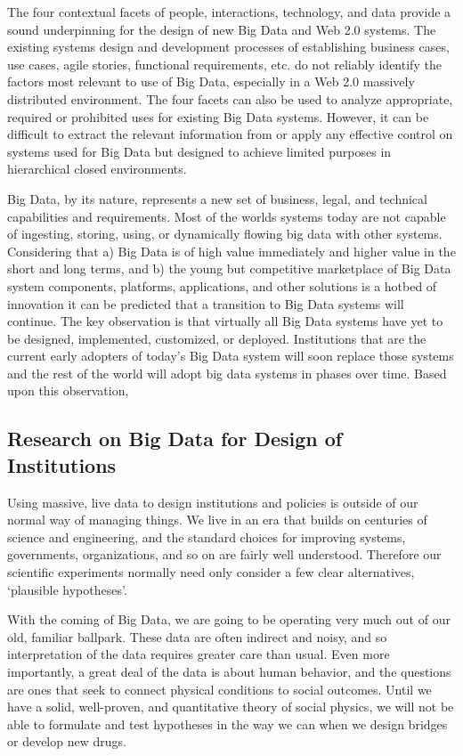 The four contextual facets of people, interactions, technology, and data provide a sound underpinning for the design of new Big Data and Web 2.0 systems.
The existing systems design and development processes of establishing business cases, use cases, agile stories, functional requirements, etc. do not reliably identify the factors most relevant to use of Big Data, especially in a Web 2.0 massively distributed environment.
The four facets can also be used to analyze appropriate, required or prohibited uses for existing Big Data systems.
However, it can be difficult to extract the relevant information from or apply any effective control on systems used for Big Data but designed to achieve limited purposes in hierarchical closed environments.

Big Data, by its nature, represents a new set of business, legal, and technical capabilities and requirements.
Most of the worlds systems today are not capable of ingesting, storing, using, or dynamically flowing big data with other systems.
Considering that a) Big Data is of high value immediately and higher value in the short and long terms, and b) the young but competitive marketplace of Big Data system components, platforms, applications, and other solutions is a hotbed of innovation it can be predicted that a transition to Big Data systems will continue.
The key observation is that virtually all Big Data systems have yet to be designed, implemented, customized, or deployed.
Institutions that are the current early adopters of today’s Big Data system will soon replace those systems and the rest of the world will adopt big data systems in phases over time.
Based upon this observation, 

\subsection{Research on Big Data for Design of Institutions}

Using massive, live data to design institutions and policies is outside of our normal way of managing things.
We live in an era that builds on centuries of science and engineering, and the standard choices for improving systems, governments, organizations, and so on are fairly well understood. 
Therefore our scientific experiments normally need only consider a few clear alternatives, `plausible hypotheses'.

With the coming of Big Data, we are going to be operating very much out of our old, familiar ballpark.
These data are often indirect and noisy, and so interpretation of the data requires greater care than usual.
Even more importantly, a great deal of the data is about human behavior, and the questions are ones that seek to connect physical conditions to social outcomes.
Until we have a solid, well-proven, and quantitative theory of social physics, we will not be able to formulate and test hypotheses in the way we can when we design bridges or develop new drugs.

